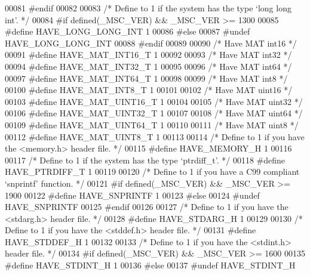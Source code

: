 \begin{DoxyCode}
00081 \textcolor{preprocessor}{#endif}
00082 
00083 \textcolor{comment}{/* Define to 1 if the system has the type `long long int'. */}
00084 \textcolor{preprocessor}{#if defined(\_MSC\_VER) && \_MSC\_VER >= 1300}
00085 \textcolor{preprocessor}{#define HAVE\_LONG\_LONG\_INT 1}
00086 \textcolor{preprocessor}{#else}
00087 \textcolor{preprocessor}{#undef HAVE\_LONG\_LONG\_INT}
00088 \textcolor{preprocessor}{#endif}
00089 
00090 \textcolor{comment}{/* Have MAT int16 */}
00091 \textcolor{preprocessor}{#define HAVE\_MAT\_INT16\_T 1}
00092 
00093 \textcolor{comment}{/* Have MAT int32 */}
00094 \textcolor{preprocessor}{#define HAVE\_MAT\_INT32\_T 1}
00095 
00096 \textcolor{comment}{/* Have MAT int64 */}
00097 \textcolor{preprocessor}{#define HAVE\_MAT\_INT64\_T 1}
00098 
00099 \textcolor{comment}{/* Have MAT int8 */}
00100 \textcolor{preprocessor}{#define HAVE\_MAT\_INT8\_T 1}
00101 
00102 \textcolor{comment}{/* Have MAT uint16 */}
00103 \textcolor{preprocessor}{#define HAVE\_MAT\_UINT16\_T 1}
00104 
00105 \textcolor{comment}{/* Have MAT uint32 */}
00106 \textcolor{preprocessor}{#define HAVE\_MAT\_UINT32\_T 1}
00107 
00108 \textcolor{comment}{/* Have MAT uint64 */}
00109 \textcolor{preprocessor}{#define HAVE\_MAT\_UINT64\_T 1}
00110 
00111 \textcolor{comment}{/* Have MAT uint8 */}
00112 \textcolor{preprocessor}{#define HAVE\_MAT\_UINT8\_T 1}
00113 
00114 \textcolor{comment}{/* Define to 1 if you have the <memory.h> header file. */}
00115 \textcolor{preprocessor}{#define HAVE\_MEMORY\_H 1}
00116 
00117 \textcolor{comment}{/* Define to 1 if the system has the type `ptrdiff\_t'. */}
00118 \textcolor{preprocessor}{#define HAVE\_PTRDIFF\_T 1}
00119 
00120 \textcolor{comment}{/* Define to 1 if you have a C99 compliant `snprintf' function. */}
00121 \textcolor{preprocessor}{#if defined(\_MSC\_VER) && \_MSC\_VER >= 1900}
00122 \textcolor{preprocessor}{#define HAVE\_SNPRINTF 1}
00123 \textcolor{preprocessor}{#else}
00124 \textcolor{preprocessor}{#undef HAVE\_SNPRINTF}
00125 \textcolor{preprocessor}{#endif}
00126 
00127 \textcolor{comment}{/* Define to 1 if you have the <stdarg.h> header file. */}
00128 \textcolor{preprocessor}{#define HAVE\_STDARG\_H 1}
00129 
00130 \textcolor{comment}{/* Define to 1 if you have the <stddef.h> header file. */}
00131 \textcolor{preprocessor}{#define HAVE\_STDDEF\_H 1}
00132 
00133 \textcolor{comment}{/* Define to 1 if you have the <stdint.h> header file. */}
00134 \textcolor{preprocessor}{#if defined(\_MSC\_VER) && \_MSC\_VER >= 1600}
00135 \textcolor{preprocessor}{#define HAVE\_STDINT\_H 1}
00136 \textcolor{preprocessor}{#else}
00137 \textcolor{preprocessor}{#undef HAVE\_STDINT\_H}

\end{DoxyCode}
